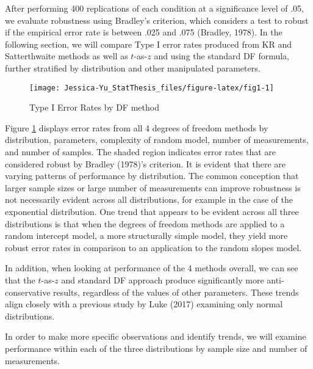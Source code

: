 \documentclass[12pt, twoside]{amherstthesis}
\begin{document}
After performing 400 replications of each condition at a significance level of .05, we evaluate robustness using Bradley's criterion, which considers a test to robust if the empirical error rate is between .025 and .075 (Bradley, 1978). In the following section, we will compare Type I error rates produced from KR and Satterthwaite methods as well as \(t\)-as-\(z\) and using the standard DF formula, further stratified by distribution and other manipulated parameters.
\begin{figure}

{\centering \texttt{[image: Jessica-Yu\_StatThesis\_files/figure-latex/fig1-1]} 

}

\caption{Type I Error Rates by DF method}\label{fig:fig1}
\end{figure}
Figure \ref{fig:fig1} displays error rates from all 4 degrees of freedom methods by distribution, parameters, complexity of random model, number of measurements, and number of samples. The shaded region indicates error rates that are considered robust by Bradley (1978)'s criterion. It is evident that there are varying patterns of performance by distribution. The common conception that larger sample sizes or large number of measurements can improve robustness is not necessarily evident across all distributions, for example in the case of the exponential distribution. One trend that appears to be evident across all three distributions is that when the degrees of freedom methods are applied to a random intercept model, a more structurally simple model, they yield more robust error rates in comparison to an application to the random slopes model.

In addition, when looking at performance of the 4 methods overall, we can see that the \(t\)-as-\(z\) and standard DF approach produce significantly more anti-conservative results, regardless of the values of other parameters. These trends align closely with a previous study by Luke (2017) examining only normal distributions.

In order to make more specific observations and identify trends, we will examine performance within each of the three distributions by sample size and number of measurements.
\end{document}
